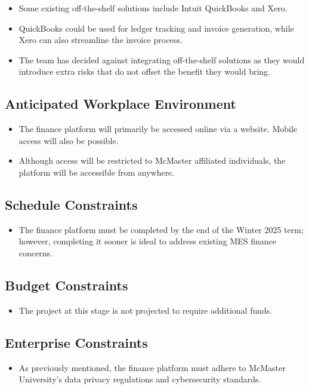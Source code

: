 \documentclass[12pt]{article}
\begin{document}
\begin{itemize}
    \item Some existing off-the-shelf solutions include Intuit QuickBooks and Xero.
    \item QuickBooks could be used for ledger tracking and invoice generation, while Xero can also streamline the invoice process.
    \item The team has decided against integrating off-the-shelf solutions as they would introduce extra risks that do not offset the benefit they would bring. 
\end{itemize}
 
\subsection{Anticipated Workplace Environment}
\begin{itemize}
    \item The finance platform will primarily be accessed online via a website. Mobile access will also be possible. 
    \item Although access will be restricted to McMaster affiliated individuals, the platform will be accessible from anywhere.
\end{itemize}
 

\subsection{Schedule Constraints}
\begin{itemize}
    \item The finance platform must be completed by the end of the Winter 2025 term; however, completing it sooner is ideal to address existing MES finance concerns.
\end{itemize}


\subsection{Budget Constraints}
\begin{itemize}
    \item The project at this stage is not projected to require additional funds.
\end{itemize}

\subsection{Enterprise Constraints}
\begin{itemize}
    \item As previously mentioned, the finance platform must adhere to McMaster University’s data privacy regulations and cybersecurity standards.
\end{itemize}
\end{document}
